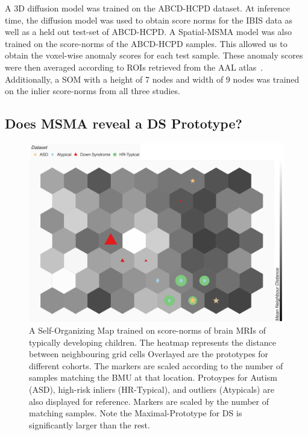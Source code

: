 A 3D diffusion model was trained on the ABCD-HCPD dataset. At inference time, the diffusion model was used to obtain score norms for the IBIS data as well as a held out test-set of ABCD-HCPD. A Spatial-MSMA model was also trained on the score-norms of the ABCD-HCPD samples. This allowed us to obtain the voxel-wise anomaly scores for each test sample. These anomaly scores were then averaged according to ROIs retrieved from the AAL atlas~\cite{ROLLS2020116189}. Additionally, a SOM with a height of 7 nodes and width of 9 nodes was trained on the inlier score-norms from all three studies. 


\subsection*{Does MSMA reveal a DS Prototype?}

\begin{figure}[tbhp]
\centering
\includegraphics[width=\textwidth]{figures/som_9x7.png}
\caption{A Self-Organizing Map trained on score-norms of brain MRIs of typically developing children. The heatmap represents the distance between neighbouring grid cells
Overlayed are the prototypes for different cohorts.
The markers are scaled according to the number of samples matching the BMU at that location. Protoypes for Autism (ASD), high-risk inliers (HR-Typical), and outliers (Atypicals) are also displayed for reference. Markers are scaled by the number of matching samples. Note the Maximal-Prototype for DS is significantly larger than the rest. 
}
\label{fig:som-abcd}
\end{figure}


